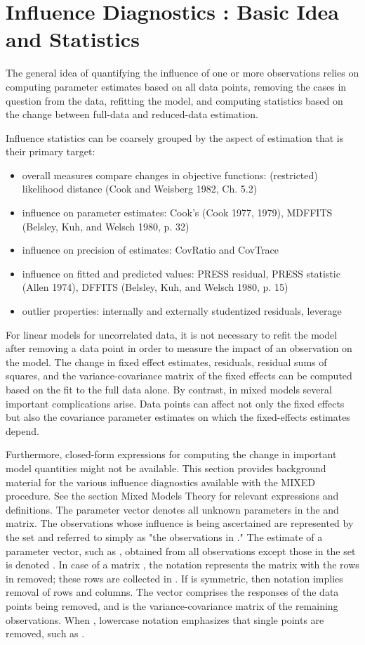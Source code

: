 \documentclass[12pt, a4paper]{article}
\begin{document}
\section*{Influence Diagnostics : Basic Idea and Statistics}

The general idea of quantifying the influence of one or more observations relies on computing parameter estimates based on all data points, removing the cases in question from the data, refitting the model, and computing statistics based on the change between full-data and reduced-data estimation. 

Influence statistics can be coarsely grouped by the aspect of estimation that is their primary target:
\begin{itemize}
	\item overall measures compare changes in objective functions: (restricted) likelihood distance (Cook and Weisberg 1982, Ch. 5.2)
	\item influence on parameter estimates: Cook’s  (Cook 1977, 1979), MDFFITS (Belsley, Kuh, and Welsch 1980, p. 32)
	\item influence on precision of estimates: CovRatio and CovTrace
	\item influence on fitted and predicted values: PRESS residual, PRESS statistic (Allen 1974), DFFITS (Belsley, Kuh, and Welsch 1980, p. 15)
	\item outlier properties: internally and externally studentized residuals, leverage
\end{itemize}
For linear models for uncorrelated data, it is not necessary to refit the model after removing a data point in order to measure the impact of an observation on the model. The change in fixed effect estimates, residuals, residual sums of squares, and the variance-covariance matrix of the fixed effects can be computed based on the fit to the full data alone. By contrast, in mixed models several important complications arise. Data points can affect not only the fixed effects but also the covariance parameter estimates on which the fixed-effects estimates depend. 

Furthermore, closed-form expressions for computing the change in important model quantities might not be available.
This section provides background material for the various influence diagnostics available with the MIXED procedure. See the section Mixed Models Theory for relevant expressions and definitions. The parameter vector  denotes all unknown parameters in the  and  matrix.
The observations whose influence is being ascertained are represented by the set  and referred to simply as "the observations in ." The estimate of a parameter vector, such as , obtained from all observations except those in the set  is denoted . In case of a matrix , the notation  represents the matrix with the rows in  removed; these rows are collected in . If  is symmetric, then notation  implies removal of rows and columns. The vector  comprises the responses of the data points being removed, and  is the variance-covariance matrix of the remaining observations. When , lowercase notation emphasizes that single points are removed, such as .
\end{document}
